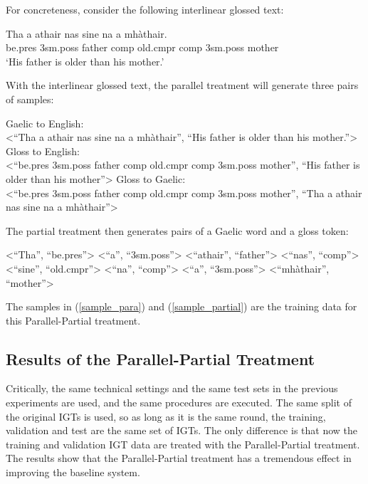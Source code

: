 \documentclass[final]{ua-thesis}
\numberwithin{equation}{section}
\begin{document}
For concreteness, consider the following interlinear glossed text: 
\begin{exe}  
\ex \gll    Tha a athair nas sine na a mh\`athair.\\  
            be.pres 3sm.poss father comp old.cmpr comp 3sm.poss mother\\  
    \glt    `His father is older than his mother.'  
\end{exe}

With the interlinear glossed text, the parallel treatment will generate three pairs of samples:

\begin{exe}
	\ex\label{sample_para}
	\begin{xlist}
		\ex Gaelic to English: \\<``Tha a athair nas sine na a mh\`athair'', ``His father is older than his mother.''>
		\ex Gloss to English: \\<``be.pres 3sm.poss father comp old.cmpr comp 3sm.poss mother'', ``His father is older than his mother''>
		\ex Gloss to Gaelic: \\<``be.pres 3sm.poss father comp old.cmpr comp 3sm.poss mother'', ``Tha a athair nas sine na a mh\`athair''>
	\end{xlist}
\end{exe}

The partial treatment then generates pairs of a Gaelic word and a gloss token: 
\begin{exe}
	\ex\label{sample_partial}
	\begin{xlist}
		\ex <``Tha'', ``be.pres''>
		\ex <``a'', ``3sm.poss''>
		\ex <``athair'', ``father''>
		\ex <``nas'', ``comp''>
		\ex <``sine'', ``old.cmpr''>
		\ex <``na'', ``comp''>
		\ex <``a'', ``3sm.poss''>
		\ex <``mh\`athair'', ``mother''>
	\end{xlist}
\end{exe}

The samples in (\ref{sample_para}) and (\ref{sample_partial}) are the training data for this Parallel-Partial treatment. 

\subsection{Results of the Parallel-Partial Treatment}

Critically, the same technical settings and the same test sets in the previous experiments are used, and the same procedures are executed. The same split of the original IGTs is used, so as long as it is the same round, the training, validation and test are the same set of IGTs. The only difference is that now the training and validation IGT data are treated with the Parallel-Partial treatment. The results show that the Parallel-Partial treatment has a tremendous effect in improving the baseline system. 
\end{document}
